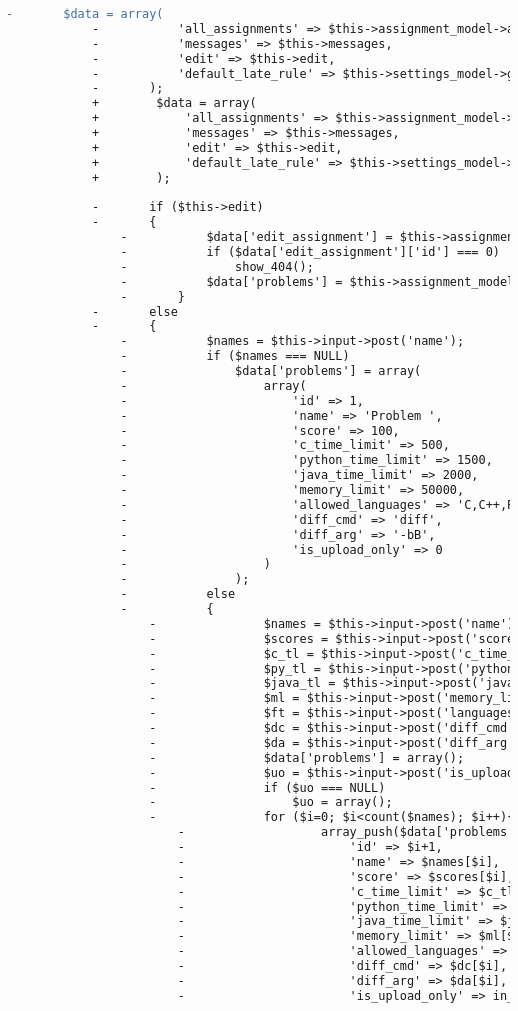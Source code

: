 \begin{lstlisting}[language=diff, caption=Perubahan pada kode Assignments.php]
			-		$data = array(
			-			'all_assignments' => $this->assignment_model->all_assignments(),
			-			'messages' => $this->messages,
			-			'edit' => $this->edit,
			-			'default_late_rule' => $this->settings_model->get_setting('default_late_rule'),
			-		);
			+        $data = array(
			+            'all_assignments' => $this->assignment_model->all_assignments(),
			+            'messages' => $this->messages,
			+            'edit' => $this->edit,
			+            'default_late_rule' => $this->settings_model->get_setting('default_late_rule'),
			+        );
			
			-		if ($this->edit)
			-		{
				-			$data['edit_assignment'] = $this->assignment_model->assignment_info($this->edit_assignment);
				-			if ($data['edit_assignment']['id'] === 0)
				-				show_404();
				-			$data['problems'] = $this->assignment_model->all_problems($this->edit_assignment);
				-		}
			-		else
			-		{
				-			$names = $this->input->post('name');
				-			if ($names === NULL)
				-				$data['problems'] = array(
				-					array(
				-						'id' => 1,
				-						'name' => 'Problem ',
				-						'score' => 100,
				-						'c_time_limit' => 500,
				-						'python_time_limit' => 1500,
				-						'java_time_limit' => 2000,
				-						'memory_limit' => 50000,
				-						'allowed_languages' => 'C,C++,Python 2,Python 3,Java',
				-						'diff_cmd' => 'diff',
				-						'diff_arg' => '-bB',
				-						'is_upload_only' => 0
				-					)
				-				);
				-			else
				-			{
					-				$names = $this->input->post('name');
					-				$scores = $this->input->post('score');
					-				$c_tl = $this->input->post('c_time_limit');
					-				$py_tl = $this->input->post('python_time_limit');
					-				$java_tl = $this->input->post('java_time_limit');
					-				$ml = $this->input->post('memory_limit');
					-				$ft = $this->input->post('languages');
					-				$dc = $this->input->post('diff_cmd');
					-				$da = $this->input->post('diff_arg');
					-				$data['problems'] = array();
					-				$uo = $this->input->post('is_upload_only');
					-				if ($uo === NULL)
					-					$uo = array();
					-				for ($i=0; $i<count($names); $i++){
						-					array_push($data['problems'], array(
						-						'id' => $i+1,
						-						'name' => $names[$i],
						-						'score' => $scores[$i],
						-						'c_time_limit' => $c_tl[$i],
						-						'python_time_limit' => $py_tl[$i],
						-						'java_time_limit' => $java_tl[$i],
						-						'memory_limit' => $ml[$i],
						-						'allowed_languages' => $ft[$i],
						-						'diff_cmd' => $dc[$i],
						-						'diff_arg' => $da[$i],
						-						'is_upload_only' => in_array($i+1,$uo)?1:0,

\end{lstlisting}
